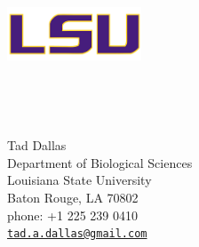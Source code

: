 \documentclass[12pt]{article}
\newcommand{\email}[1]{\href{mailto:#1}{\tt \textcolor{cornflower}{#1}}}
\begin{document}
\begin{minipage}[c]{8in}\vskip-2cm
\begin{flushleft}
	\begin{minipage}[c]{4cm}
		\begin{flushleft}
			\includegraphics*[width=4cm]{lsu.png}%
		\end{flushleft}
	\end{minipage}
	\,\,
	\begin{minipage}[c]{0.25cm}
		\vrule depth 0.1\textheight
	\end{minipage}
	\,
	\begin{minipage}[c]{8cm}
		\footnotesize
		{\sffamily
			Tad Dallas \\
			Department of Biological Sciences \\
			Louisiana State University \\
			Baton Rouge, LA 70802 \\
			phone: +1 225 239 0410  \\
			\email{tad.a.dallas@gmail.com}
		}
	\end{minipage}
\end{flushleft}
\end{minipage}
\end{document}
